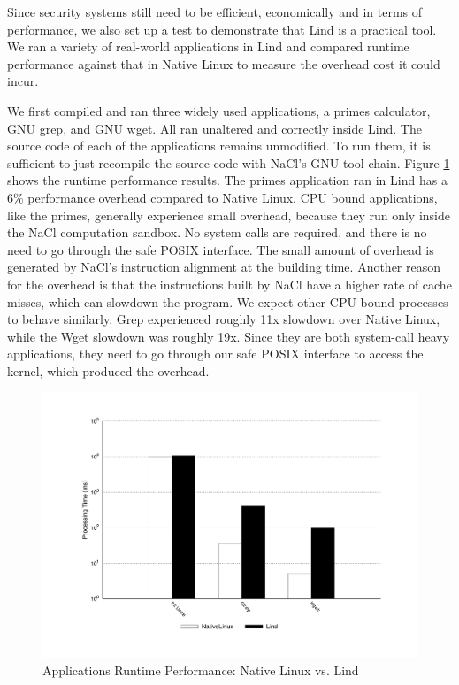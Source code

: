 Since security systems still need to be efficient, economically and in
terms of performance, 
we also set up a test to demonstrate that Lind is a practical tool. 
We ran a variety of real-world applications in Lind and compared runtime
performance 
against that in Native Linux to measure the overhead cost it could incur.

We first compiled and ran three widely used applications, 
a primes calculator, GNU grep, and GNU wget. All ran unaltered and
correctly inside Lind. The source code of each of the applications remains 
unmodified. To run them, it is sufficient to just recompile the source code with 
NaCl's GNU tool chain.
Figure \ref{fig:performance_applications} shows the runtime performance
results. 
The primes application ran in Lind has a 6\% performance overhead compared to 
Native Linux. CPU bound applications, like the primes, generally experience small overhead, 
because they run only inside the NaCl computation sandbox. No system calls are required, 
and there is no need to go through the safe POSIX interface. The small amount of overhead 
is generated by NaCl's instruction alignment at the building time. Another reason for the overhead 
is that the instructions built by NaCl have a higher rate of cache misses, which can slowdown the 
program. 
We expect other CPU bound processes to behave similarly. 
Grep experienced roughly 11x slowdown over Native Linux, while the Wget
slowdown was roughly 19x. Since they are both system-call heavy applications, they need to go 
through our safe POSIX interface to access the kernel, which produced the overhead.  

\begin{figure}
\centering
\includegraphics[width=1.0\columnwidth]{diagram/lind_oakland16_performance.pdf}
\caption{Applications Runtime Performance: Native Linux vs. Lind}
\label{fig:performance_applications}
\end{figure}

